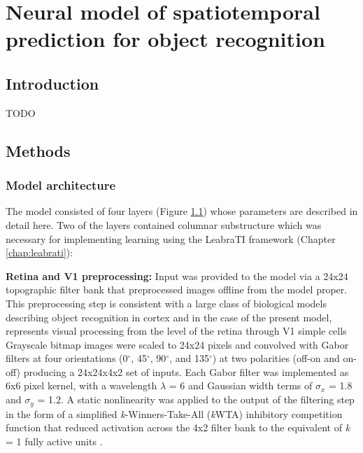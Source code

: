 \documentclass[dwyatte_dissertation.tex]{subfiles}
\begin{document}
\chapter{Neural model of spatiotemporal prediction for object recognition}

\section{Introduction}
TODO

\section{Methods}

\subsection{Model architecture}

The model consisted of four layers (Figure \ref{fig:v1_v2}) whose parameters are described in detail here. Two of the layers contained columnar substructure which was necessary for implementing learning using the LeabraTI framework (Chapter \ref{chap:leabrati}):

\begin{figure}[h!]
\begin{center}
\end{center}
\caption{}{}
\label{fig:v1_v2}
\end{figure}

\textbf{Retina and V1 preprocessing:} Input was provided to the model via a 24x24 topographic filter bank that preprocessed images offline from the model proper. This preprocessing step is consistent with a large class of biological models describing object recognition in cortex \cite[e.g.,]{RiesenhuberPoggio99,SerreOlivaPoggio07,OReillyWyatteHerdEtAl13} and in the case of the present model, represents visual processing from the level of the retina through V1 simple cells \cite{HubelWiesel62} Grayscale bitmap images were scaled to 24x24 pixels and convolved with Gabor filters at four orientations (0$^\circ$, 45$^\circ$, 90$^\circ$, and 135$^\circ$) at two polarities (off-on and on-off) producing a 24x24x4x2 set of inputs. Each Gabor filter was implemented as 6x6 pixel kernel, with a wavelength $\lambda$ = 6 and Gaussian width terms of $\sigma_x$ = 1.8 and $\sigma_y$ = 1.2. A static nonlinearity was applied to the output of the filtering step in the form of a simplified \textit{k}-Winners-Take-All (\textit{k}WTA) inhibitory competition function that reduced activation across the 4x2 filter bank to the equivalent of \textit{k} = 1 fully active units \cite[see][Supporting Information]{OReillyWyatteHerdEtAl13}.
\end{document}
